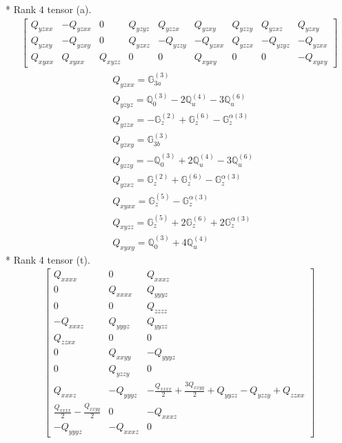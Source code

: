 \documentclass[fleqn,8pt,landscape]{jsarticle}
\begin{document}
* Rank 4 tensor (a).
\begin{align*}
\begin{bmatrix} Q_{yzxx} & - Q_{yzxx} & 0 & Q_{yzyz} & Q_{yzzx} & Q_{yzxy} & Q_{yzzy} & Q_{yzxz} & Q_{yzxy} \\ Q_{yzxy} & - Q_{yzxy} & 0 & Q_{yzxz} & - Q_{yzzy} & - Q_{yzxx} & Q_{yzzx} & - Q_{yzyz} & - Q_{yzxx} \\ Q_{xyxx} & Q_{xyxx} & Q_{xyzz} & 0 & 0 & Q_{xyxy} & 0 & 0 & - Q_{xyxy} \end{bmatrix}
\end{align*}
\begin{align*}
& Q_{yzxx} = \mathbb{G}_{3a}^{(3)} \\
& Q_{yzyz} = \mathbb{Q}_{0}^{(3)} - 2 \mathbb{Q}_{u}^{(4)} - 3 \mathbb{Q}_{u}^{(6)} \\
& Q_{yzzx} = - \mathbb{G}_{z}^{(2)} + \mathbb{G}_{z}^{(6)} - \mathbb{G}_{z}^{\alpha(3)} \\
& Q_{yzxy} = \mathbb{G}_{3b}^{(3)} \\
& Q_{yzzy} = - \mathbb{Q}_{0}^{(3)} + 2 \mathbb{Q}_{u}^{(4)} - 3 \mathbb{Q}_{u}^{(6)} \\
& Q_{yzxz} = \mathbb{G}_{z}^{(2)} + \mathbb{G}_{z}^{(6)} - \mathbb{G}_{z}^{\alpha(3)} \\
& Q_{xyxx} = \mathbb{G}_{z}^{(5)} - \mathbb{G}_{z}^{\alpha(3)} \\
& Q_{xyzz} = \mathbb{G}_{z}^{(5)} + 2 \mathbb{G}_{z}^{(6)} + 2 \mathbb{G}_{z}^{\alpha(3)} \\
& Q_{xyxy} = \mathbb{Q}_{0}^{(3)} + 4 \mathbb{Q}_{u}^{(4)}
\end{align*}
* Rank 4 tensor (t).
\begin{align*}
\begin{bmatrix} Q_{xxxx} & 0 & Q_{xxxz} \\ 0 & Q_{xxxx} & Q_{yyyz} \\ 0 & 0 & Q_{zzzz} \\ - Q_{xxxz} & Q_{yyyz} & Q_{yyzz} \\ Q_{zzxx} & 0 & 0 \\ 0 & Q_{xxyy} & - Q_{yyyz} \\ 0 & Q_{yzzy} & 0 \\ Q_{xxxz} & - Q_{yyyz} & - \frac{Q_{xxxx}}{2} + \frac{3 Q_{xxyy}}{2} + Q_{yyzz} - Q_{yzzy} + Q_{zzxx} \\ \frac{Q_{xxxx}}{2} - \frac{Q_{xxyy}}{2} & 0 & - Q_{xxxz} \\ - Q_{yyyz} & - Q_{xxxz} & 0 \end{bmatrix}
\end{align*}
\end{document}
